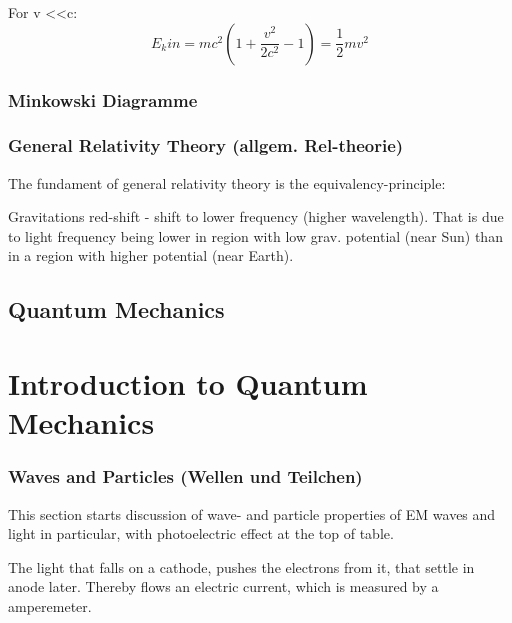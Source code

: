\documentclass{report}
\begin{document}
For v \textless \textless c:
\begin{equation*}
    E_kin = mc^2 (1 + \frac{v^2}{2c^2} - 1) = \frac{1}{2} mv^2
\end{equation*}


\section{Minkowski Diagramme}
\section{General Relativity Theory (allgem. Rel-theorie)}
The fundament of general relativity theory is the equivalency-principle:

Gravitations red-shift - shift to lower frequency (higher wavelength). That is due to light frequency being lower in region with low grav. potential (near Sun) than in a region with higher potential (near Earth).


\chapter{Quantum Mechanics}

\part{Introduction to Quantum Mechanics}
\section{Waves and Particles (Wellen und Teilchen)}
This section starts discussion of wave- and particle properties of EM waves and light in particular, with photoelectric effect at the top of table. 

The light that falls on a cathode, pushes the electrons from it, that settle in anode later. Thereby flows an electric current, which is measured by a amperemeter. 
\end{document}
